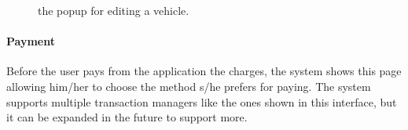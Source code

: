 \begin{figure}[h!]
\begin{minipage}{0.49\textwidth}
        \caption{the popup for editing a vehicle.}
    \end{minipage}
\end{figure}

\pagebreak

\paragraph{Payment} Before the user pays from the application the charges, the system shows this page allowing him/her to choose the method s/he prefers for paying. The system supports multiple transaction managers like the ones shown in this interface, but it can be expanded in the future to support more.

